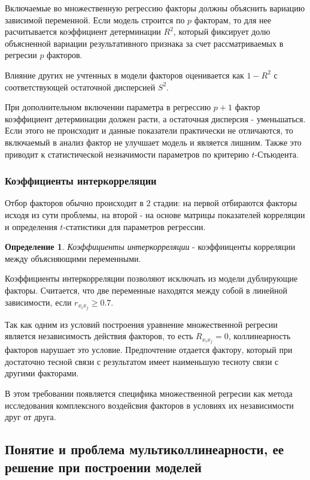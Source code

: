 \documentclass[aps,%
12pt,%
final,%
oneside,
onecolumn,%
musixtex, %
superscriptaddress,%
centertags]{article} %
\theoremstyle{plain}
\theoremstyle{definition}
\newtheorem{definition}{Определение}[subsection]
\theoremstyle{remark}
\begin{document}
Включаемые во множественную регрессию факторы должны объяснить вариацию зависимой переменной. Если модель строится по $p$ факторам, то для нее расчитывается коэффициент детерминации $R^2$, который фиксирует долю объясненной вариации результативного признака за счет рассматриваемых в регресии $p$ факторов.

Влияние других не учтенных в модели факторов оценивается как $1-R^2$ с соответствующей остаточной дисперсией $S^2$.

При дополнительном включении параметра в регрессию $p+1$ фактор коэффициент детерминации должен расти, а остаточная дисперсия - уменьшаться. Если этого не происходит и данные показатели практически не отличаются, то включаемый в анализ фактор не улучшает модель и является лишним. Также это приводит к статистической незначимости параметров по критерию $t$-Стьюдента.

\subsubsection{Коэффициенты интеркорреляции}

Отбор факторов обычно происходит в $2$ стадии: на первой отбираются факторы исходя из сути проблемы, на второй - на основе матрицы показателей корреляции и определения $t$-статистики для параметров регрессии.

\begin{definition}
	\textit{Коэффициенты интеркорреляции} - коэффииценты корреляции между объясняющими переменными.
\end{definition}

Коэффициенты интеркорреляции позволяют исключать из модели дублирующие факторы. Считается, что две переменные находятся между собой в линейной зависимости, если $r_{x_ix_j} \geq 0.7$. 

Так как одним из условий построения уравнение множественной регресии является независимость действия факторов, то есть $R_{x_ix_j}=0$, коллинеарность факторов нарушает это условие. Предпочтение отдается фактору, который при достаточно тесной связи с результатом имеет наименьшую тесноту связи с другими факторами. 

В этом требовании появляется специфика множественной регресии как метода исследования комплексного воздейсвия факторов в условиях их независимости друг от друга.

\newpage
\subsection{Понятие и проблема мультиколлинеарности, ее решение при построении моделей}
\end{document}
